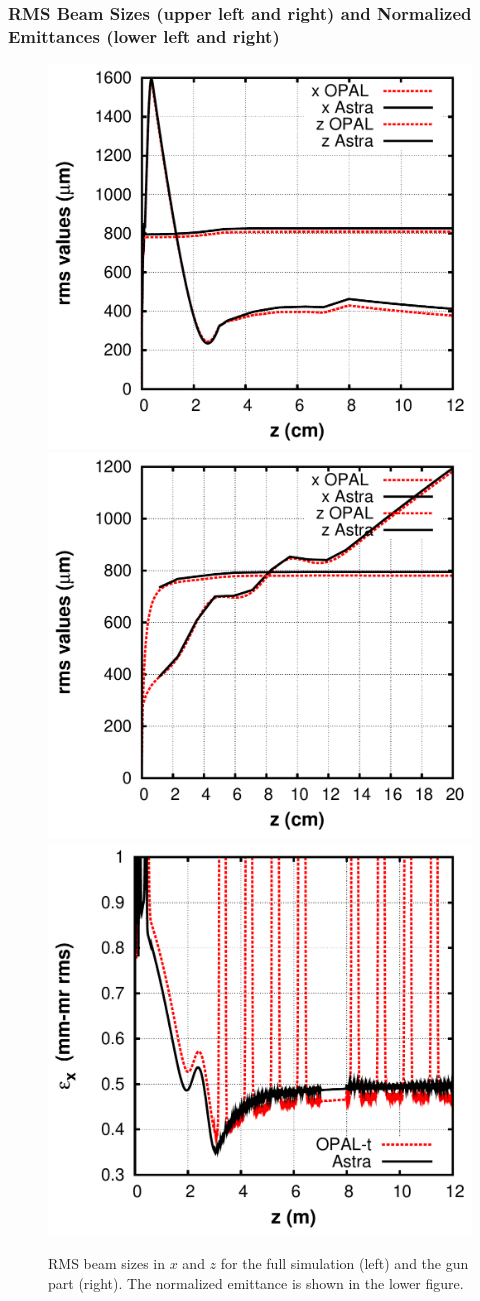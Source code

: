 \documentclass{psi-note}    %
\begin{document}
{\subsubsection{RMS Beam Sizes (upper left and right)  and Normalized Emittances (lower left and right) }
\begin{figure}[htbp]
\begin{center}
\includegraphics[width=.49\linewidth,angle=0]{figures/opal-astra-sc-xzrms-1}
\includegraphics[width=.49\linewidth,angle=0]{figures/opal-astra-sc-xzrms-2}
\includegraphics[width=.6\linewidth,angle=0]{figures/opal-astra-sc-exrms-1}
\caption{ RMS beam sizes in $x$ and $z$ for the full simulation (left) and the gun part (right). The normalized
emittance is shown in the lower figure. }
\label{fig:opal-astra-nosc-rmsvals-1}
\end{center}
\end{figure}
\clearpage
}
\end{document}
